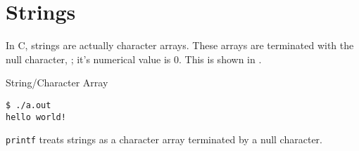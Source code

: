 \section{Strings}\label{sec:Strings}
In C, strings are actually character arrays.
These arrays are terminated with the null character, \cinline{\0}; it's numerical value is 0.
This is shown in .

\begin{listing}[h!tbp]
\caption{String/Character Array}
\label{lst:String_Character_Array}
\begin{verbatim}
$ ./a.out
hello world!
\end{verbatim}
\end{listing}

\texttt{printf} treats strings as a character array terminated by a null character.


